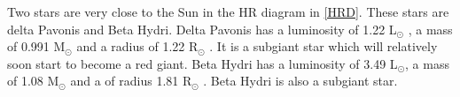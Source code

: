 \documentclass{aa}
\begin{document}



Two stars are very close to the Sun in the HR diagram in \ref{HRD}. These stars are delta Pavonis and Beta Hydri.
%
Delta Pavonis has a luminosity of 1.22 L$_\odot$ \citep{Bruntt_2010}, a mass of 0.991 M$_\odot$ and a radius of 1.22 R$_\odot$ \citep{2008yCat..21680297T}.
%
It is a subgiant star which will relatively soon start to become a red giant.
%
Beta Hydri has a luminosity of 3.49 L$_\odot$, a mass of 1.08 M$_\odot$ and a of radius 1.81 R$_\odot$ \citep{Brand_o_2011}.
%
Beta Hydri is also a subgiant star. 

\end{document}
